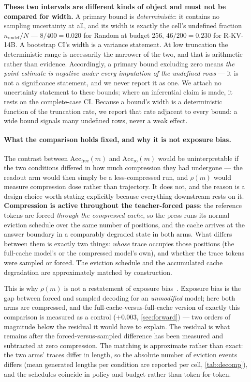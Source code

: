 \documentclass{article}
\newcommand{\accfree}[1]{\mathrm{Acc}_{\mathrm{free}}(#1)}
\newcommand{\accro}[1]{\mathrm{Acc}_{\mathrm{ro}}(#1)}
\newcommand{\res}[1]{\rho(#1)}
\begin{document}
\textbf{These two intervals are different kinds of object and must not be compared for width.} A primary bound is \emph{deterministic}: it contains no sampling uncertainty at all, and its width is exactly the cell's undefined fraction $n_{\mathrm{undef}}/N$ --- $8/400 = 0.020$ for Random at budget 256, $46/200 = 0.230$ for R-KV-14B. A bootstrap CI's width is a variance statement. At low truncation the deterministic range is necessarily the narrower of the two, and that is arithmetic rather than evidence. Accordingly, a primary bound excluding zero means \emph{the point estimate is negative under every imputation of the undefined rows} --- it is not a significance statement, and we never report it as one. We attach no uncertainty statement to these bounds; where an inferential claim is made, it rests on the complete-case CI. Because a bound's width is a deterministic function of the truncation rate, we report that rate adjacent to every bound: a wide bound signals many undefined rows, never a weak effect.

\paragraph{What the comparison holds fixed, and why it is not exposure bias.} The contrast between $\accfree{m}$ and $\accro{m}$ would be uninterpretable if the two conditions differed in how much compression they had undergone --- the readout arm would then simply be a less-compressed run, and $\res{m}$ would measure compression dose rather than trajectory. It does not, and the reason is a design choice worth stating explicitly because everything downstream rests on it. \textbf{Compression is active throughout the teacher-forced pass}: the reference tokens are forced \emph{through the compressed cache}, so the press runs its normal eviction schedule over the same number of positions, and the cache arrives at the answer boundary in a comparably degraded state in both arms. What differs between them is exactly two things: \emph{whose} trace occupies those positions (the full-cache model's or the compressed model's own), and whether the trace tokens were sampled or forced. The eviction schedule and the accumulated cache degradation are approximately matched by construction.

This is why $\res{m}$ is not a restatement of exposure bias~\citep{ranzato2016exposure,bengio2015scheduled}. Exposure bias is the gap between forced and sampled decoding for an \emph{unmodified} model; here both arms are compressed, and the full-cache-versus-full-cache version of exactly this comparison is measured as a control ($+0.003$, \cref{sec:forward}) --- two orders of magnitude below the residual it would have to explain. The residual is what remains after the forced-versus-sampled difference has been measured and subtracted at zero compression. The matching is approximate rather than exact: the two arms' traces differ in length, so the absolute number of eviction events differs (mean generated lengths per condition are reported per cell, \cref{tab:decomp}), and the schedules coincide in policy and budget rather than token-for-token.
\end{document}
